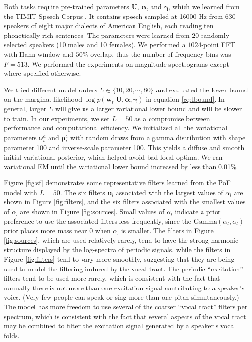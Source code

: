 \documentclass{article} %
\begin{document}
Both tasks require pre-trained parameters $\mathbf{U}$, $\bm{\alpha}$, and $\bm{\gamma}$, which we learned from the TIMIT Speech Corpus \cite{fisher1986darpa}. It contains speech sampled at 16000 Hz from 630 speakers of eight major dialects of American English, each reading ten phonetically rich sentences. The parameters were learned from 20 randomly selected speakers (10 males and 10 females). We performed a $1024$-point FFT with Hann window and $50\%$ overlap, thus the number of frequency bins was $F = 513$. We performed the experiments on magnitude spectrograms except where specified otherwise. 

We tried different model orders $L \in \{10, 20, \cdots, 80\}$ and
evaluated the lower bound on the marginal likelihood $\log p(\bm{w}_t
| \mathbf{U}, \bm{\alpha}, \bm{\gamma})$ in equation
\ref{eq:lbound}. In general, larger $L$ will give us a larger
variational lower bound and will be slower to train. 
In our experiments, we set $L = 50$ as a compromise between performance 
and computational efficiency. 
We initialized all the variational parameters $\bm{\nu}_t^a$ and $\bm{\rho}_t^a$ with random draws from a gamma distribution with shape parameter 100 and inverse-scale parameter 100. This yields a diffuse and smooth initial variational posterior, which helped avoid bad local optima.
We ran variational EM until the variational lower bound increased by less than 0.01\%. 

Figure \ref{fig:sf} demonstrates some representative filters learned from the PoF model with $L = 50$.
The six filters $\bm{u}_l$ associated with the largest values of
$\alpha_l$ are shown in Figure \ref{fig:filters}, and the six filters
associated with the smallest values of $\alpha_l$ are shown in Figure
\ref{fig:sources}. Small values of $\alpha_l$ indicate a prior
preference to use the associated filters less frequently, since the
$\mathrm{Gamma}(\alpha_l,\alpha_l)$ prior places more mass near 0 when
$\alpha_l$ is smaller. The filters in Figure \ref{fig:sources}, which
are used relatively rarely, tend to have the strong harmonic structure
displayed by the log-spectra of periodic signals, while the filters in
Figure \ref{fig:filters} tend to vary more smoothly, suggesting that
they are being used to model the filtering induced by the vocal tract.
The periodic ``excitation'' filters tend to be used more rarely, which is consistent with the fact that normally there is not more than one excitation signal contributing to a speaker's voice. (Very few people can speak or sing more than one pitch simultaneously.) The model has more freedom to use several of the coarser ``vocal tract'' filters per spectrum, which is consistent with the fact that several aspects of the vocal tract may be combined to filter the excitation signal generated by a speaker's vocal folds.
\end{document}
